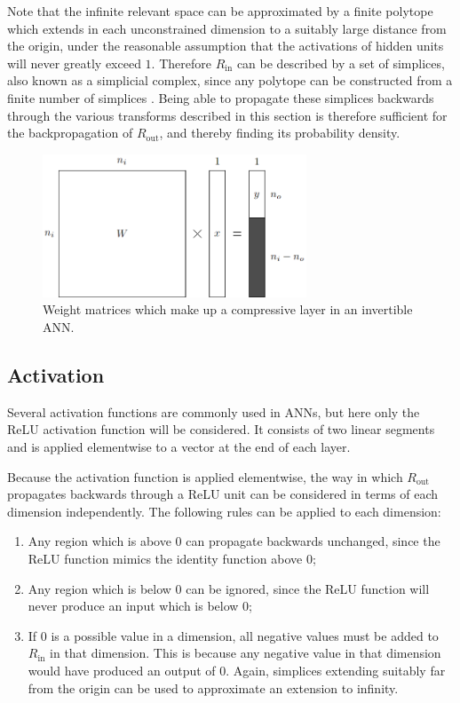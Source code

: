 \documentclass[../../main.tex]{subfiles}
\begin{document}
Note that the infinite relevant space can be approximated by a finite polytope which extends in each unconstrained dimension to a suitably large distance from the origin, under the reasonable assumption that the activations of hidden units will never greatly exceed $1$.
Therefore $R_\text{in}$ can be described by a set of simplices, also known as a simplicial complex, since any polytope can be constructed from a finite number of simplices \cite{wildberger12}.
Being able to propagate these simplices backwards through the various transforms described in this section is therefore sufficient for the backpropagation of $R_\text{out}$, and thereby finding its probability density.
\begin{figure}[H]
    \begin{center}
    \includegraphics[width=0.7\textwidth]{compressiveLayer}
    \caption[Compressive layer of an invertible ANN]{
        Weight matrices which make up a compressive layer in an invertible ANN.
    }
    \label{fig:compressiveLayer}
    \end{center}
\end{figure}

\subsection{Activation} \label{subsection:activation}

Several activation functions are commonly used in ANNs, but here only the ReLU activation function \cite{agarap19} will be considered.
It consists of two linear segments and is applied elementwise to a vector at the end of each layer.

Because the activation function is applied elementwise, the way in which $R_\text{out}$ propagates backwards through a ReLU unit can be considered in terms of each dimension independently.
The following rules can be applied to each dimension:
\begin{enumerate}
    \item Any region which is above $0$ can propagate backwards unchanged, since the ReLU function mimics the identity function above $0$;
    \item Any region which is below $0$ can be ignored, since the ReLU function will never produce an input which is below $0$;
    \item If $0$ is a possible value in a dimension, all negative values must be added to $R_\text{in}$ in that dimension.
    This is because any negative value in that dimension would have produced an output of $0$.
    Again, simplices extending suitably far from the origin can be used to approximate an extension to infinity.
\end{enumerate}
\end{document}
